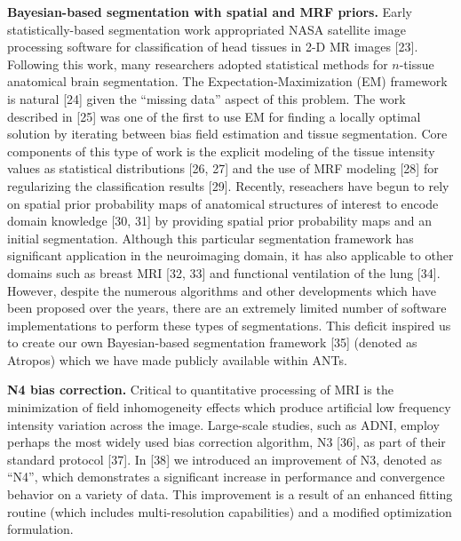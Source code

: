 \documentclass[11pt,]{article}
\begin{document}
\textbf{Bayesian-based segmentation with spatial and MRF priors.} Early
statistically-based segmentation work appropriated NASA satellite image
processing software for classification of head tissues in 2-D MR images
{[}23{]}. Following this work, many researchers adopted statistical
methods for $n$-tissue anatomical brain segmentation. The
Expectation-Maximization (EM) framework is natural {[}24{]} given the
``missing data'' aspect of this problem. The work described in {[}25{]}
was one of the first to use EM for finding a locally optimal solution by
iterating between bias field estimation and tissue segmentation. Core
components of this type of work is the explicit modeling of the tissue
intensity values as statistical distributions {[}26, 27{]} and the use
of MRF modeling {[}28{]} for regularizing the classification results
{[}29{]}. Recently, reseachers have begun to rely on spatial prior
probability maps of anatomical structures of interest to encode domain
knowledge {[}30, 31{]} by providing spatial prior probability maps and
an initial segmentation. Although this particular segmentation framework
has significant application in the neuroimaging domain, it has also
applicable to other domains such as breast MRI {[}32, 33{]} and
functional ventilation of the lung {[}34{]}. However, despite the
numerous algorithms and other developments which have been proposed over
the years, there are an extremely limited number of software
implementations to perform these types of segmentations. This deficit
inspired us to create our own Bayesian-based segmentation framework
{[}35{]} (denoted as Atropos) which we have made publicly available
within ANTs.

\textbf{N4 bias correction.} Critical to quantitative processing of MRI
is the minimization of field inhomogeneity effects which produce
artificial low frequency intensity variation across the image.
Large-scale studies, such as ADNI, employ perhaps the most widely used
bias correction algorithm, N3 {[}36{]}, as part of their standard
protocol {[}37{]}. In {[}38{]} we introduced an improvement of N3,
denoted as ``N4'', which demonstrates a significant increase in
performance and convergence behavior on a variety of data. This
improvement is a result of an enhanced fitting routine (which includes
multi-resolution capabilities) and a modified optimization formulation.
\end{document}
